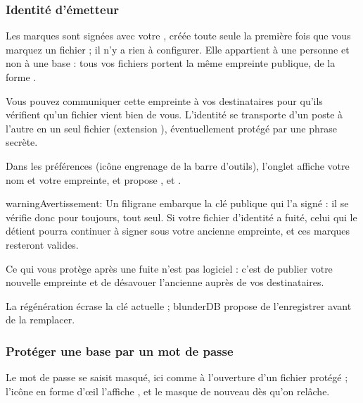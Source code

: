 \documentclass[letterpaper,10pt,french]{sphinxmanual}
\begin{document}
\subsubsection{Identité d’émetteur}
\label{\detokenize{manuel:identite-d-emetteur}}
\sphinxAtStartPar
Les marques sont signées avec votre , créée toute seule
la première fois que vous marquez un fichier ; il n’y a rien à configurer. Elle
appartient à une personne et non à une base : tous vos fichiers portent la même
empreinte publique, de la forme .

\sphinxAtStartPar
Vous pouvez communiquer cette empreinte à vos destinataires pour qu’ils
vérifient qu’un fichier vient bien de vous. L’identité se transporte d’un poste
à l’autre en un seul fichier (extension ), éventuellement protégé par
une phrase secrète. 

\sphinxAtStartPar
Dans les préférences (icône engrenage de la barre d’outils), l’onglet  affiche votre nom et votre empreinte, et propose ,  et .

\begin{sphinxadmonition}{warning}{Avertissement:}
\sphinxAtStartPar
{} Un filigrane embarque la clé publique qui l’a
signé : il se vérifie donc pour toujours, tout seul. Si votre fichier
d’identité a fuité, celui qui le détient pourra continuer à signer sous votre
ancienne empreinte, et ces marques resteront valides.

\sphinxAtStartPar
Ce qui vous protège après une fuite n’est pas logiciel : c’est de publier
votre nouvelle empreinte et de désavouer l’ancienne auprès de vos
destinataires.

\sphinxAtStartPar
La régénération écrase la clé actuelle ; blunderDB propose de l’enregistrer
avant de la remplacer.
\end{sphinxadmonition}


\subsubsection{Protéger une base par un mot de passe}
\label{\detokenize{manuel:proteger-une-base-par-un-mot-de-passe}}
\sphinxAtStartPar
Le mot de passe se saisit masqué, ici comme à l’ouverture d’un fichier protégé ;
l’icône en forme d’œil l’affiche , et le
masque de nouveau dès qu’on relâche.
\end{document}
